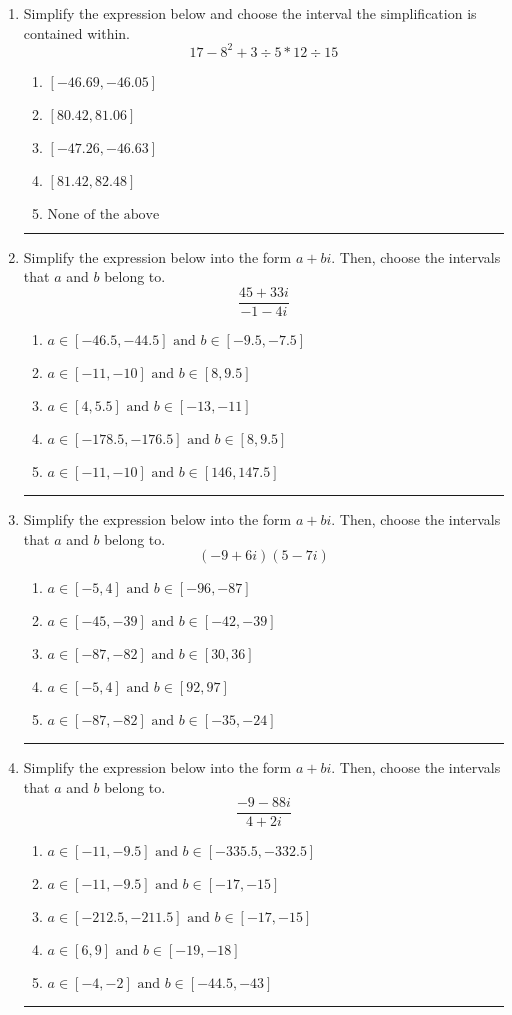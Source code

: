 \documentclass[14pt]{extbook}
\newcommand{\litem}[1]{\item#1\hspace*{-1cm}\rule{\textwidth}{0.4pt}}
\begin{document}
\begin{enumerate}
\litem{
Simplify the expression below and choose the interval the simplification is contained within.\[ 17 - 8^2 + 3 \div 5 * 12 \div 15 \]\begin{enumerate}[label=\Alph*.]
\item \( [-46.69, -46.05] \)
\item \( [80.42, 81.06] \)
\item \( [-47.26, -46.63] \)
\item \( [81.42, 82.48] \)
\item \( \text{None of the above} \)

\end{enumerate} }
\litem{
Simplify the expression below into the form $a+bi$. Then, choose the intervals that $a$ and $b$ belong to.\[ \frac{45 + 33 i}{-1 - 4 i} \]\begin{enumerate}[label=\Alph*.]
\item \( a \in [-46.5, -44.5] \text{ and } b \in [-9.5, -7.5] \)
\item \( a \in [-11, -10] \text{ and } b \in [8, 9.5] \)
\item \( a \in [4, 5.5] \text{ and } b \in [-13, -11] \)
\item \( a \in [-178.5, -176.5] \text{ and } b \in [8, 9.5] \)
\item \( a \in [-11, -10] \text{ and } b \in [146, 147.5] \)

\end{enumerate} }
\litem{
Simplify the expression below into the form $a+bi$. Then, choose the intervals that $a$ and $b$ belong to.\[ (-9 + 6 i)(5 - 7 i) \]\begin{enumerate}[label=\Alph*.]
\item \( a \in [-5, 4] \text{ and } b \in [-96, -87] \)
\item \( a \in [-45, -39] \text{ and } b \in [-42, -39] \)
\item \( a \in [-87, -82] \text{ and } b \in [30, 36] \)
\item \( a \in [-5, 4] \text{ and } b \in [92, 97] \)
\item \( a \in [-87, -82] \text{ and } b \in [-35, -24] \)

\end{enumerate} }
\litem{
Simplify the expression below into the form $a+bi$. Then, choose the intervals that $a$ and $b$ belong to.\[ \frac{-9 - 88 i}{4 + 2 i} \]\begin{enumerate}[label=\Alph*.]
\item \( a \in [-11, -9.5] \text{ and } b \in [-335.5, -332.5] \)
\item \( a \in [-11, -9.5] \text{ and } b \in [-17, -15] \)
\item \( a \in [-212.5, -211.5] \text{ and } b \in [-17, -15] \)
\item \( a \in [6, 9] \text{ and } b \in [-19, -18] \)
\item \( a \in [-4, -2] \text{ and } b \in [-44.5, -43] \)


\end{enumerate}}
\end{enumerate}
\end{document}
